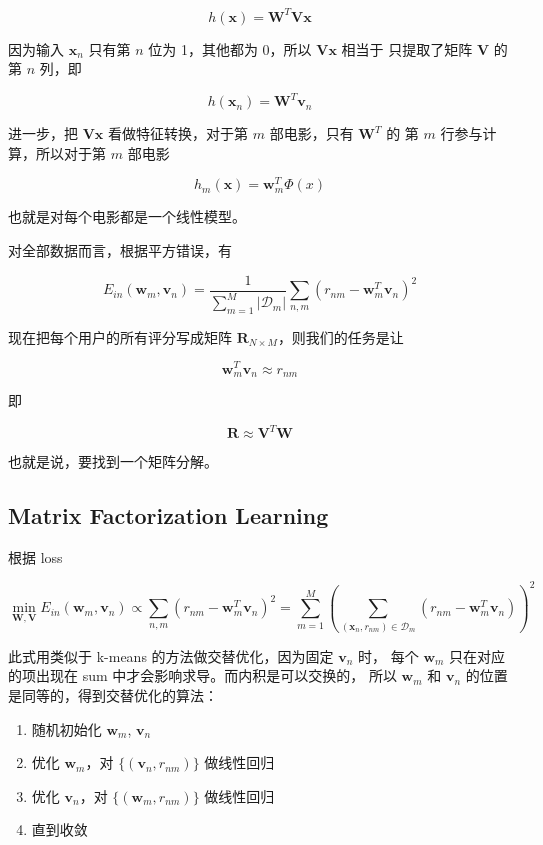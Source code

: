 \documentclass[a4paper]{article}
\begin{document}
$$h(\mathbf{x})=\mathbf{W}^T\mathbf{Vx}$$

因为输入 $\mathbf{x}_n$ 只有第 $n$ 位为 1，其他都为 0，所以 $\mathbf{Vx}$ 相当于
只提取了矩阵 $\mathbf{V}$ 的第 $n$ 列，即

$$h(\mathbf{x}_n)=\mathbf{W}^T\mathbf{v}_n$$

进一步，把 $\mathbf{Vx}$ 看做特征转换，对于第 $m$ 部电影，只有 $\mathbf{W}^T$ 的
第 $m$ 行参与计算，所以对于第 $m$ 部电影

$$h_m(\mathbf{x})=\mathbf{w}_m^T\Phi(x)$$

也就是对每个电影都是一个线性模型。

对全部数据而言，根据平方错误，有

$$E_{in}(\mathbf{w}_m, \mathbf{v}_n) = \frac{1}{\displaystyle\sum_{m=1}^M|\mathcal{D}_m|}\sum_{n, m}(r_{nm} - \mathbf{w}_m^T\mathbf{v}_n)^2$$

现在把每个用户的所有评分写成矩阵 $\mathbf{R}_{N\times M}$，则我们的任务是让

$$\mathbf{w}_m^T\mathbf{v}_n \approx r_{nm}$$

即

$$\mathbf{R} \approx \mathbf{V}^T\mathbf{W}$$

也就是说，要找到一个矩阵分解。

\subsection{Matrix Factorization Learning}
根据 loss

$$\operatorname*{min}_{\mathbf{W, V}} E_{in}(\mathbf{w}_m, \mathbf{v}_n) \propto \sum_{n, m}(r_{nm} - \mathbf{w}_m^T\mathbf{v}_n)^2 = \displaystyle\sum_{m=1}^{M}\left (\displaystyle \sum_{(\mathbf{x}_n,r_{nm}) \in \mathcal{D}_m}(r_{nm}-\mathbf{w}_m^T\mathbf{v}_n) \right )^2$$

此式用类似于 k-means 的方法做交替优化，因为固定 $\mathbf{v}_n$ 时，
每个 $\mathbf{w}_m$ 只在对应的项出现在 sum 中才会影响求导。而内积是可以交换的，
所以 $\mathbf{w}_m$ 和 $\mathbf{v}_n$ 的位置是同等的，得到交替优化的算法：

\begin{enumerate}
  \item 随机初始化 $\mathbf{w}_m$, $\mathbf{v}_n$ \\
  \item 优化 $\mathbf{w}_m$，对 $\{(\mathbf{v}_n, r_{nm})\}$ 做线性回归\\
  \item 优化 $\mathbf{v}_n$，对 $\{(\mathbf{w}_m, r_{nm})\}$ 做线性回归\\
  \item 直到收敛\\
\end{enumerate}
\end{document}
